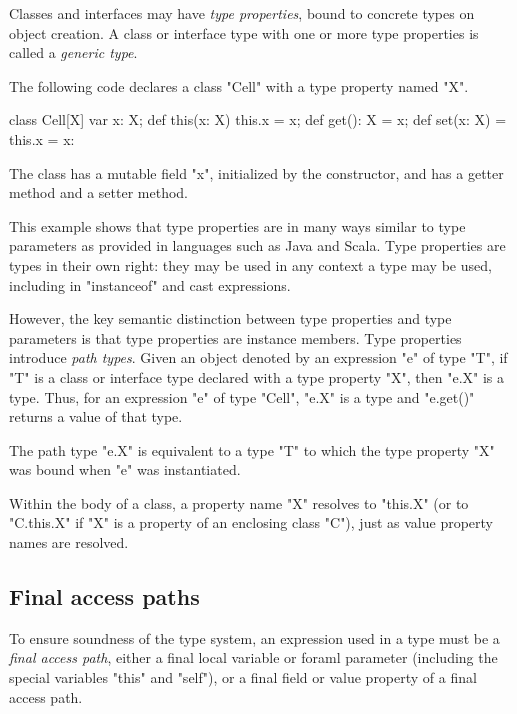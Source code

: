 
        Classes and interfaces may have {\em type properties}, bound
        to concrete types on object creation.
        A class or interface type
        with one or more type properties is called a {\em
        generic type}.

The following code declares a class \xcd"Cell" with a type
property named \xcd"X".
\begin{xten}
class Cell[X] {
    var x: X;
    def this(x: X) { this.x = x; }
    def get(): X = x;
    def set(x: X) = { this.x = x: }
}
\end{xten}
The class has a mutable field \xcd"x", initialized by the
constructor, and has a getter method and a setter method.

This example shows that type properties are in many ways similar to
type parameters as provided in languages such as Java and Scala.
Type properties are types in their own right:
they may be used in any context a type may be used,
including in \xcd"instanceof" and cast expressions.

However, the key semantic distinction between type properties
and type parameters is that type properties are instance
members.
%
        Type properties introduce {\em path types}.
        Given an object
        denoted by an expression \xcd"e" of type \xcd"T",
        if \xcd"T" is a class or interface type declared with
        a type property \xcd"X", then \xcd"e.X" is a type.
Thus, for an expression \xcd"e" of type \xcd"Cell", \xcd"e.X" is a type
and \xcd"e.get()" returns a value of that type.

The path type \xcd"e.X" is equivalent to a type \xcd"T" to which
the type property \xcd"X" was bound when \xcd"e" was
instantiated.

Within the body of a class, a property name \xcd"X" resolves
to \xcd"this.X" (or to \xcd"C.this.X" if \xcd"X" is a property of
an enclosing class \xcd"C"), just as value property names are
resolved.

\subsection{Final access paths}
\label{FinalAccessPath}

        To ensure soundness of the type system, an expression
        used in a type
        must be a \emph{final access path}, either a final
        local variable or foraml parameter (including the special variables
        \xcd"this" and \xcd"self"), or a final field or value
        property of a final access path.

